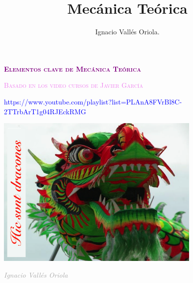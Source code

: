 \documentclass[a4paper, 10pt, spanish]{book}
\title{Mecánica Teórica}
\author{Ignacio Vallés Oriola.}
\date{}
\numberwithin{equation}{chapter}
\numberwithin{teor}{chapter}
\numberwithin{coro}{chapter}
\numberwithin{prop}{chapter}
\numberwithin{defi}{chapter}
\numberwithin{axio}{chapter}
\numberwithin{ejem}{chapter}
\numberwithin{ejer}{chapter}
\numberwithin{ejre}{chapter}
\numberwithin{ayud}{chapter}
\numberwithin{solu}{chapter}
\numberwithin{prob}{chapter}
\begin{document}
\begin{titlepage}
	\centering
	\vspace*{\fill}
	{\scshape\huge \textcolor{purple}{\textbf{Elementos clave de Mecánica Teórica}}\par}
	\vspace{1cm}
	{\scshape\large \textcolor{violet}{Basado en los video cursos de Javier García}\par}
	\vspace{1cm}
	{\scriptsize  \textcolor{blue}{https://www.youtube.com/playlist?list=PLAnA8FVrBl8C-2TTrbArT1g04RJEckRMG}    \par}

	\vspace{3cm}
	\includegraphics[width=0.75\textwidth]{imagenes/hic-svnt-dracones}
	\vspace{2cm}
	\begin{flushright}
		{\normalsize \textcolor{darkgray}{\textit{Ignacio Vallés Oriola}} \par}
	\end{flushright}
\end{titlepage}

\tableofcontents














































%
\appendix

		
\end{document}
